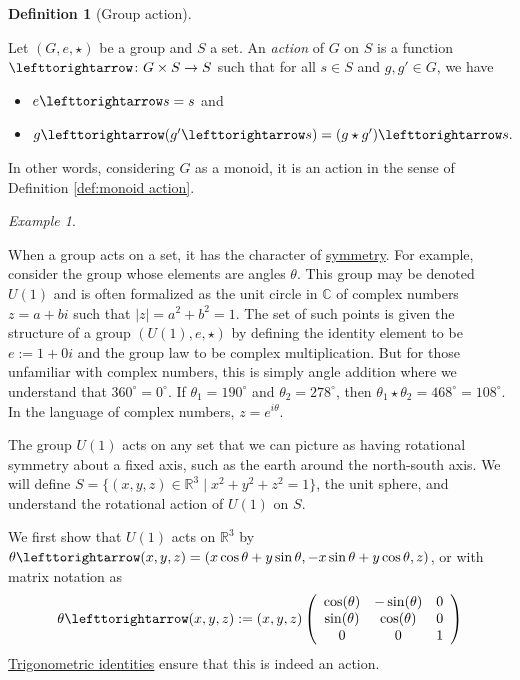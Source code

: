 \documentclass{book}
\def\RR{{\mathbb R}}
\def\CC{{\mathbb C}}
\def\to{\rightarrow}
\def\taking{\colon}
\def\|{{\;|\;}}
\def\acts{\lefttorightarrow}
\theoremstyle{remark}
\newtheorem{example}[subsubsection]{Example}
\theoremstyle{definition}
\newtheorem{definition}[subsubsection]{Definition}
\begin{document}
\begin{definition}[Group action]\label{def:group action}

Let $(G,e,\star)$ be a group and $S$ a set. An {\em action} of $G$ on $S$ is a function $\acts\taking G\times S\to S$ such that for all $s\in S$ and $g,g'\in G$, we have
\begin{itemize}
\item $e\acts s=s$ and
\item $g\acts(g'\acts s)=(g\star g')\acts s.$
\end{itemize}
In other words, considering $G$ as a monoid, it is an action in the sense of Definition \ref{def:monoid action}.

\end{definition}

\begin{example}\label{ex:U(1)}

When a group acts on a set, it has the character of \href{http://en.wikipedia.org/wiki/Symmetry}{\text symmetry}. For example, consider the group whose elements are angles $\theta$. This group may be denoted $U(1)$ and is often formalized as the unit circle in $\CC$ of complex numbers $z=a+bi$ such that $|z|=a^2+b^2=1$. The set of such points is given the structure of a group $(U(1),e,\star)$ by defining the identity element to be $e:=1+0i$ and the group law to be complex multiplication. But for those unfamiliar with complex numbers, this is simply angle addition where we understand that $360^\circ=0^\circ$. If $\theta_1=190^\circ$ and $\theta_2=278^\circ$, then $\theta_1\star\theta_2=468^\circ=108^\circ.$ In the language of complex numbers, $z=e^{i\theta}$.

The group $U(1)$ acts on any set that we can picture as having rotational symmetry about a fixed axis, such as the earth around the north-south axis. We will define $S=\{(x,y,z)\in\RR^3\|x^2+y^2+z^2=1\}$, the unit sphere, and understand the rotational action of $U(1)$ on $S$.

We first show that $U(1)$ acts on $\RR^3$ by $\theta\acts(x,y,z)=(x\cos\theta+y\sin\theta, -x\sin\theta+y\cos\theta,z)$, or with matrix notation as 
$$\theta\acts(x,y,z)
:=(x,y,z)\left(\begin{array}{ccc}
\cos(\theta)&-\sin(\theta)&0\\
\sin(\theta)&\cos(\theta)&0\\
0&0&1\end{array}\right)
$$
\href{http://en.wikipedia.org/wiki/List_of_trigonometric_identities#Matrix_form}{\text Trigonometric identities} ensure that this is indeed an action.


\end{example}
\end{document}

